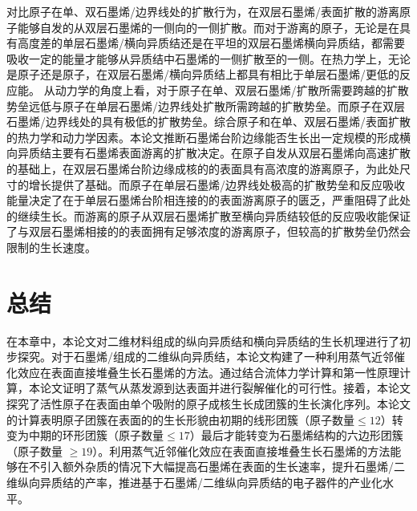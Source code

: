     对比原子在单、双石墨烯/边界线处的扩散行为，在双层石墨烯/表面扩散的游离原子能够自发的从双层石墨烯的一侧向的一侧扩散。而对于游离的原子，无论是在具有高度差的单层石墨烯/横向异质结还是在平坦的双层石墨烯横向异质结，都需要吸收一定的能量才能够从异质结中石墨烯的一侧扩散至的一侧。在热力学上，无论是原子还是原子，在双层石墨烯/横向异质结上都具有相比于单层石墨烯/更低的反应能。
    从动力学的角度上看，对于原子在单、双层石墨烯/扩散所需要跨越的扩散势垒远低与原子在单层石墨烯/边界线处扩散所需跨越的扩散势垒。而原子在双层石墨烯/边界线处的具有极低的扩散势垒。综合原子和在单、双层石墨烯/表面扩散的热力学和动力学因素。本论文推断石墨烯台阶边缘能否生长出一定规模的形成横向异质结主要有石墨烯表面游离的扩散决定。在原子自发从双层石墨烯向高速扩散的基础上，在双层石墨烯台阶边缘成核的的表面具有高浓度的游离原子，为此处尺寸的增长提供了基础。而原子在单层石墨烯/边界线处极高的扩散势垒和反应吸收能量决定了在于单层石墨烯台阶相连接的的表面游离原子的匮乏，严重阻碍了此处的继续生长。而游离的原子从双层石墨烯扩散至横向异质结较低的反应吸收能保证了与双层石墨烯相接的的表面拥有足够浓度的游离原子，但较高的扩散势垒仍然会限制的生长速度。
    
\section{总结}
    在本章中，本论文对二维材料组成的纵向异质结和横向异质结的生长机理进行了初步探究。对于石墨烯/组成的二维纵向异质结，本论文构建了一种利用蒸气近邻催化效应在表面直接堆叠生长石墨烯的方法。通过结合流体力学计算和第一性原理计算，本论文证明了蒸气从蒸发源到达表面并进行裂解催化的可行性。接着，本论文探究了活性原子在表面由单个吸附的原子成核生长成团簇的生长演化序列。本论文的计算表明原子团簇在表面的的生长形貌由初期的线形团簇（原子数量$\leqslant 12$）转变为中期的环形团簇（原子数量$\leqslant 17$）最后才能转变为石墨烯结构的六边形团簇（原子数量 $\geqslant 19$）。利用蒸气近邻催化效应在表面直接堆叠生长石墨烯的方法能够在不引入额外杂质的情况下大幅提高石墨烯在表面的生长速率，提升石墨烯/二维纵向异质结的产率，推进基于石墨烯/二维纵向异质结的电子器件的产业化水平。

